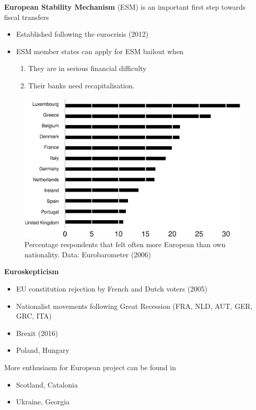 \documentclass{beamer}
\begin{document}
\begin{frame}
 \textbf{European Stability Mechanism} (ESM) is an important first step towards fiscal transfers
   \begin{itemize}
    \item Established following the eurocrisis (2012)
    \item ESM member states can apply for ESM bailout when 
    \begin{enumerate}
      \item They are in serious financial difficulty
      \item Their banks need recapitalisation. 
    \end{enumerate}
  \end{itemize}       
\end{frame}


\begin{frame}
  \begin{figure}
    \includegraphics[scale=.35]{eurobarometer.eps}
    \\  \medskip
    Percentage respondents that felt  often more European than own nationality. Data: Eurobarometer (2006)
  \end{figure}
\end{frame}

\begin{frame}
  \textbf{Euroskepticism}
  \begin{itemize}
    \item EU constitution rejection by French and Dutch voters (2005)
    \item Nationalist movements following Great Recession (FRA, NLD, AUT, GER, GRC, ITA) 
    \item Brexit (2016)
    \item Poland, Hungary
  \end{itemize}
  \medskip
  More enthusiasm for European project can be found in   
  \begin{itemize}
    \item Scotland, Catalonia
    \item Ukraine, Georgia
  \end{itemize}
\end{frame}
\end{document}
